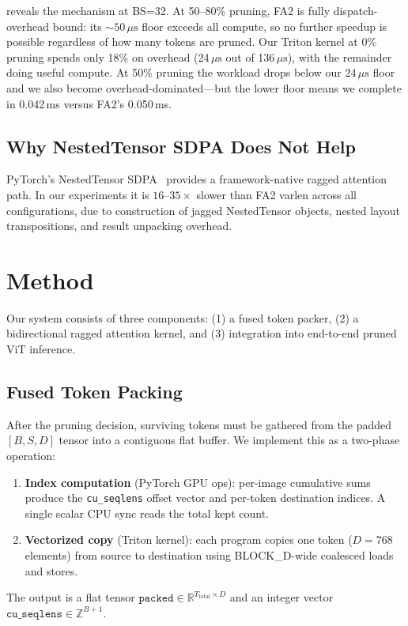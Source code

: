 \documentclass[conference]{IEEEtran}
\newcommand{\us}{\,\mu\text{s}}
\begin{document}
 reveals the mechanism at BS=32.
At 50--80\% pruning, FA2 is fully dispatch-overhead bound: its
${\sim}50\us$ floor exceeds all compute, so no further speedup is
possible regardless of how many tokens are pruned.
Our Triton kernel at 0\% pruning spends only 18\% on overhead
(24$\us$ out of 136$\us$), with the remainder doing useful compute.
At 50\% pruning the workload drops below our 24$\us$ floor and we
also become overhead-dominated---but the lower floor means we complete
in 0.042\,ms versus FA2's 0.050\,ms.

\subsection{Why NestedTensor SDPA Does Not Help}

PyTorch's NestedTensor SDPA~\cite{pytorch2024nestedtensor} provides
a framework-native ragged attention path.
In our experiments it is $16$--$35\times$ slower than FA2 varlen
across all configurations, due to construction of jagged NestedTensor
objects, nested layout transpositions, and result unpacking overhead.

\section{Method}\label{sec:kernel}

Our system consists of three components: (1) a fused token packer,
(2) a bidirectional ragged attention kernel, and (3) integration into
end-to-end pruned ViT inference.

\subsection{Fused Token Packing}

After the pruning decision, surviving tokens must be gathered from
the padded $[B, S, D]$ tensor into a contiguous flat buffer.
We implement this as a two-phase operation:
\begin{enumerate}[nosep,leftmargin=*]
  \item \textbf{Index computation} (PyTorch GPU ops): per-image
    cumulative sums produce the \texttt{cu\_seqlens} offset vector
    and per-token destination indices.
    A single scalar CPU sync reads the total kept count.
  \item \textbf{Vectorized copy} (Triton kernel): each program copies
    one token ($D{=}768$ elements) from source to destination using
    BLOCK\_D-wide coalesced loads and stores.
\end{enumerate}
The output is a flat tensor
$\texttt{packed} \in \mathbb{R}^{T_{\text{total}} \times D}$
and an integer vector
$\texttt{cu\_seqlens} \in \mathbb{Z}^{B+1}$.
\end{document}
